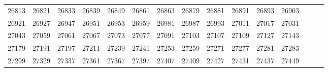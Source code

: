 \documentclass[10pt, a4paper]{article}
\begin{document}
\begin{center}
\begin{longtable}{c c c c c c c c c c c c c c c}
        26813 & 26821 & 26833 & 26839 & 26849 & 26861 & 26863 & 26879 & 26881 & 26891 & 26893 & 26903 \\
        26921 & 26927 & 26947 & 26951 & 26953 & 26959 & 26981 & 26987 & 26993 & 27011 & 27017 & 27031 \\
        27043 & 27059 & 27061 & 27067 & 27073 & 27077 & 27091 & 27103 & 27107 & 27109 & 27127 & 27143 \\
        27179 & 27191 & 27197 & 27211 & 27239 & 27241 & 27253 & 27259 & 27271 & 27277 & 27281 & 27283 \\
        27299 & 27329 & 27337 & 27361 & 27367 & 27397 & 27407 & 27409 & 27427 & 27431 & 27437 & 27449 \\
        \hline
    \end{longtable}
\end{center}
\end{document}
